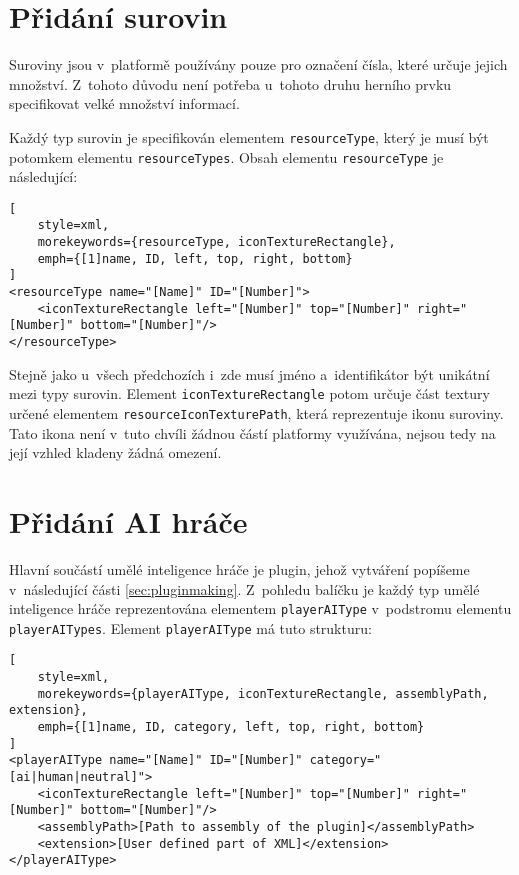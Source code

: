 \section{Přidání surovin}
Suroviny jsou v~platformě používány pouze pro označení čísla, které určuje jejich množství. Z~tohoto důvodu není potřeba u~tohoto druhu herního prvku specifikovat velké množství informací.

Každý typ surovin je specifikován elementem \texttt{resourceType}, který je musí být potomkem elementu \texttt{resourceTypes}. Obsah elementu \texttt{resourceType} je následující:

\begin{lstlisting}[
	style=xml,
	morekeywords={resourceType, iconTextureRectangle},
	emph={[1]name, ID, left, top, right, bottom}
]
<resourceType name="[Name]" ID="[Number]">
	<iconTextureRectangle left="[Number]" top="[Number]" right="[Number]" bottom="[Number]"/>
</resourceType>
\end{lstlisting}

Stejně jako u~všech předchozích i~zde musí jméno a~identifikátor být unikátní mezi typy surovin. Element \texttt{iconTextureRectangle} potom určuje část textury určené elementem \texttt{resourceIconTexturePath}, která reprezentuje ikonu suroviny. Tato ikona není v~tuto chvíli žádnou částí platformy využívána, nejsou tedy na její vzhled kladeny žádná omezení.

\section{Přidání AI hráče}
Hlavní součástí umělé inteligence hráče je plugin, jehož vytváření popíšeme v~následující části \ref{sec:pluginmaking}. Z~pohledu balíčku je každý typ umělé inteligence hráče reprezentována elementem \texttt{playerAIType} v~podstromu elementu \texttt{playerAITypes}. Element \texttt{playerAIType} má tuto strukturu:

\begin{lstlisting}[
	style=xml,
	morekeywords={playerAIType, iconTextureRectangle, assemblyPath, extension},
	emph={[1]name, ID, category, left, top, right, bottom}
]
<playerAIType name="[Name]" ID="[Number]" category="[ai|human|neutral]">
	<iconTextureRectangle left="[Number]" top="[Number]" right="[Number]" bottom="[Number]"/>
	<assemblyPath>[Path to assembly of the plugin]</assemblyPath>
	<extension>[User defined part of XML]</extension>
</playerAIType>
\end{lstlisting}


